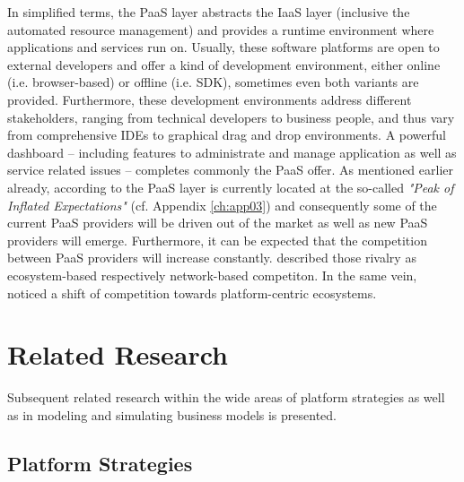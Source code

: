 In simplified terms, the \ac{PaaS} layer abstracts the \ac{IaaS} layer (inclusive the automated resource management) and provides a runtime environment where applications and services run on. Usually, these software platforms are open to external developers and offer a kind of development environment, either online (i.e. browser-based) or offline (i.e. \ac{SDK}), sometimes even both variants are provided. Furthermore, these development environments address different stakeholders, ranging from technical developers to business people, and thus vary from comprehensive \acp{IDE} to graphical drag and drop environments. A powerful dashboard -- including features to administrate and manage application as well as service related issues -- completes commonly the \ac{PaaS} offer.
As mentioned earlier already, according to \citet[p. 5]{Smith2012} the \ac{PaaS} layer is currently located at the so-called \textit{"Peak of Inflated Expectations"} (cf. Appendix \ref{ch:app03}) and consequently some of the current \ac{PaaS} providers will be driven out of the market as well as new \ac{PaaS} providers will emerge. Furthermore, it can be expected that the competition between \ac{PaaS} providers will increase constantly. \citet[pp. 117,128-129]{Iyer2010} described those rivalry as ecosystem-based respectively network-based competiton. In the same vein, \citet[pp. 675-676]{Tiwana2010} noticed a shift of competition towards platform-centric ecosystems.

\section{Related Research}\label{ch:tf:rw}

Subsequent related research within the wide areas of platform strategies as well as in modeling and simulating business models is presented.

\subsection{Platform Strategies}\label{ch:tf:rw:ps}

